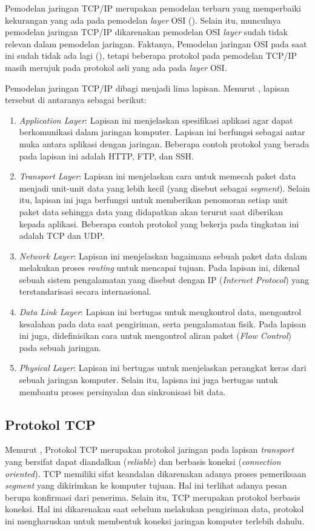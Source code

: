 Pemodelan jaringan TCP/IP merupakan pemodelan terbaru yang memperbaiki kekurangan yang ada pada pemodelan \emph{layer} OSI (\cite{forouzan2012}). Selain itu, munculnya pemodelan jaringan TCP/IP dikarenakan pemodelan OSI \emph{layer} sudah tidak relevan dalam pemodelan jaringan. Faktanya, Pemodelan jaringan OSI pada saat ini sudah tidak ada lagi (\cite{odom2022}), tetapi beberapa protokol pada pemodelan TCP/IP masih merujuk pada protokol asli yang ada pada \emph{layer} OSI.

Pemodelan jaringan TCP/IP dibagi menjadi lima lapisan. Menurut \textcite{forouzan2012}, lapisan tersebut di antaranya sebagai berikut:

\begin{enumerate}
  \item \emph{Application Layer}: Lapisan ini menjelaskan spesifikasi aplikasi agar dapat berkomunikasi dalam jaringan komputer. Lapisan ini berfungsi sebagai antar muka antara aplikasi dengan jaringan. Beberapa contoh protokol yang berada pada lapisan ini adalah HTTP, FTP, dan SSH.
  \item \emph{Transport Layer}: Lapisan ini menjelaskan cara untuk memecah paket data menjadi unit-unit data yang lebih kecil (yang disebut sebagai \emph{segment}). Selain itu, lapisan ini juga berfungsi untuk memberikan penomoran setiap unit paket data sehingga data yang didapatkan akan terurut saat diberikan kepada aplikasi. Beberapa contoh protokol yang bekerja pada tingkatan ini adalah TCP dan UDP.
  \item \emph{Network Layer}: Lapisan ini menjelaskan bagaimana sebuah paket data dalam melakukan proses \emph{routing} untuk mencapai tujuan. Pada lapisan ini, dikenal sebuah sistem pengalamatan yang disebut dengan IP (\emph{Internet Protocol}) yang terstandarisasi secara internasional.
  \item \emph{Data Link Layer}: Lapisan ini bertugas untuk mengkontrol data, mengontrol kesalahan pada data saat pengiriman, serta pengalamatan fisik. Pada lapisan ini juga, didefinisikan cara untuk mengontrol aliran paket (\emph{Flow Control}) pada sebuah jaringan.
  \item \emph{Physical Layer}: Lapisan ini bertugas untuk menjelaskan perangkat keras dari sebuah jaringan komputer. Selain itu, lapisna ini juga bertugas untuk membantu proses persinyalan dan sinkronisasi bit data.
\end{enumerate}

\subsection{Protokol TCP}
Menurut \textcite{pratama2015}, Protokol TCP merupakan protokol jaringan pada lapisan \emph{transport} yang bersifat dapat diandalkan (\emph{reliable}) dan berbasis koneksi (\emph{connection oriented}). TCP memiliki sifat keandalan dikarenakan adanya proses pemeriksaan \emph{segment} yang dikirimkan ke komputer tujuan. Hal ini terlihat adanya pesan berupa konfirmasi dari penerima. Selain itu, TCP merupakan protokol berbasis koneksi. Hal ini dikarenakan saat sebelum melakukan pengiriman data, protokol ini mengharuskan untuk membentuk koneksi jaringan komputer terlebih dahulu. 

